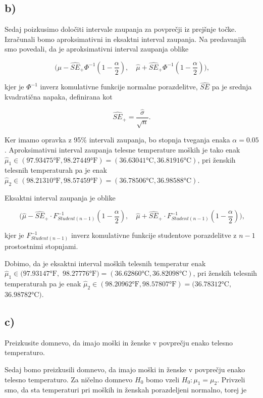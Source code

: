 \documentclass[12pt, a4paper]{article}
\begin{document}

\subsection*{b)}

Sedaj poizkusimo določiti intervale zaupanja za povprečji iz prejšnje točke. Izračunali
bomo aproksimativni in eksaktni interval zaupanja. Na predavanjih smo povedali, da je 
aproksimativni interval zaupanja oblike  

$$ \Big(\hat{\mu} - \widehat{SE}_+ \Phi^{-1}(1-\frac{\alpha}{2}), \quad 
\hat{\mu} + \widehat{SE}_+ \Phi^{-1}(1-\frac{\alpha}{2})\Big) \text{,}
$$

kjer je $\Phi^{-1}$ inverz komulativne funkcije normalne porazdelitve, $\widehat{SE}$
pa je srednja kvadratična napaka, definirana kot

$$ \widehat{SE}_+ = \frac{\hat{\sigma}}{\sqrt{n}} \text{.}
$$

Ker imamo opravka z 95\% intervali zaupanja, bo stopnja tveganja enaka $\alpha = 0.05$.
Aproksimativni interval zaupanja telesne temperature moških je tako enak 
$\hat{\mu}_1 \in (97.93475\text{°F}, 98.27449\text{°F}) = 
(36.63041\text{°C}, 36.81916\text{°C})$, pri ženskih telesnih temperaturah
pa je enak $\hat{\mu}_2 \in (98.21310\text{°F}, 98.57459\text{°F}) = 
(36.78506\text{°C}, 36.98588\text{°C})$.

Eksaktni interval zaupanja je oblike 

$$ \Big(\hat{\mu} - \widehat{SE}_+ \cdot F_{Student(n-1)}^{-1}(1-\frac{\alpha}{2}), \quad 
\hat{\mu} + \widehat{SE}_+ \cdot F_{Student(n-1)}^{-1}(1-\frac{\alpha}{2})\Big) \text{,}
$$

kjer je $F_{Student(n-1)}^{-1}$ inverz komulativne funkcije studentove porazdelitve z
$n-1$ prostostnimi stopnjami.

Dobimo, da je eksaktni interval moških telesnih temperatur enak 
$\hat{\mu}_1 \in (97.93147\text{°F},$ $98.27776\text{°F}) =  
(36.62860\text{°C}, 36.82098\text{°C})$, pri ženskih telesnih temperaturah
pa je enak $\hat{\mu}_2 \in (98.20962\text{°F}, 98.57807\text{°F}) = 
(36.78312\text{°C},$ $36.98782\text{°C})$.

\subsection*{c)}
Preizkusite domnevo, da imajo moški in ženske v povprečju enako telesno 
temperaturo.

Sedaj bomo preizkusili domnevo, da imajo moški in ženske v povprečju enako
telesno temperaturo. Za ničelno domnevo $H_0$ bomo vzeli $H_0 : \mu_1 = \mu_2$.
Privzeli smo, da sta temperaturi pri moških in ženskah porazdeljeni normalno, 
torej je 
\end{document}
